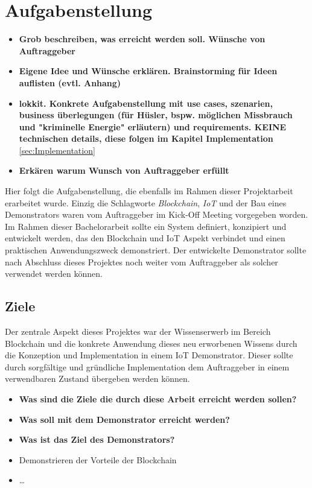 \chapter{Aufgabenstellung}
\label{cha:Aufgabenstellung}
\begin{itemize}
    \item \textbf{Grob beschreiben, was erreicht werden soll. Wünsche von Auftraggeber}
    \item \textbf{Eigene Idee und Wünsche erklären. Brainstorming für Ideen auflisten (evtl. Anhang)}
    \item \textbf{lokkit. Konkrete Aufgabenstellung mit use cases, szenarien, business überlegungen (für Hüsler, bspw. möglichen Missbrauch und "kriminelle Energie" erläutern) und requirements. KEINE technischen details, diese folgen im Kapitel Implementation} \ref{sec:Implementation}
    \item \textbf{Erkären warum Wunsch von Auftraggeber erfüllt}
\end{itemize}

Hier folgt die Aufgabenstellung, die ebenfalls im Rahmen dieser Projektarbeit erarbeitet wurde. Einzig die Schlagworte \emph{Blockchain}, \emph{\acrfull{IoT}} und der Bau eines Demonstrators waren vom Auftraggeber im Kick-Off Meeting vorgegeben worden. Im Rahmen dieser Bachelorarbeit sollte ein System definiert, konzipiert und entwickelt werden, das den Blockchain und IoT Aspekt verbindet und einen praktischen Anwendungszweck demonstriert. Der entwickelte Demonstrator sollte nach Abschluss dieses Projektes noch weiter vom Auftraggeber als solcher verwendet werden können.

\section{Ziele}
\label{sec:Ziele}
Der zentrale Aspekt dieses Projektes war der Wissenserwerb im Bereich Blockchain und die konkrete Anwendung dieses neu erworbenen Wissens durch die Konzeption und Implementation in einem IoT Demonstrator. Dieser sollte durch sorgfältige und gründliche Implementation dem Auftraggeber in einem verwendbaren Zustand übergeben werden können.

\begin{itemize}
    \item \textbf{ Was sind die Ziele die durch diese Arbeit erreicht werden sollen? }
    \item \textbf{ Was soll mit dem Demonstrator erreicht werden? }
    \item \textbf{ Was ist das Ziel des Demonstrators? }
    \item Demonstrieren der Vorteile der Blockchain
    \item \dots
\end{itemize}

